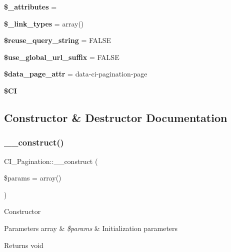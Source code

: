 \begin{DoxyCompactItemize}
{\bfseries \$\+\_\+attributes} = \textquotesingle{}\textquotesingle{}
\item 
\mbox{\label{class_c_i___pagination_a63e99aae2467079fab32b3f7cde3a826}} 
{\bfseries \$\+\_\+link\+\_\+types} = array()
\item 
\mbox{\label{class_c_i___pagination_a5fe5c72a94f8e6bd754d5e19edf2b03c}} 
{\bfseries \$reuse\+\_\+query\+\_\+string} = F\+A\+L\+SE
\item 
\mbox{\label{class_c_i___pagination_ac5aebb3787c54eb43b049c39f379b55e}} 
{\bfseries \$use\+\_\+global\+\_\+url\+\_\+suffix} = F\+A\+L\+SE
\item 
\mbox{\label{class_c_i___pagination_a8b4c5eb3147f58a9e01782ca735e7660}} 
{\bfseries \$data\+\_\+page\+\_\+attr} = \textquotesingle{}data-\/ci-\/pagination-\/page\textquotesingle{}
\item 
\mbox{\label{class_c_i___pagination_a2d4177a5ace764b61f32b93b162ef060}} 
{\bfseries \$\+CI}
\end{DoxyCompactItemize}


\subsection{Constructor \& Destructor Documentation}
\mbox{\label{class_c_i___pagination_ae95f7119c3793c9f65f64c714f85b504}} 
\subsubsection{\texorpdfstring{\+\_\+\+\_\+construct()}{\_\_construct()}}
{\footnotesize\ttfamily C\+I\+\_\+\+Pagination\+::\+\_\+\+\_\+construct (\begin{DoxyParamCaption}\item[{}]{\$params = {\ttfamily array()} }\end{DoxyParamCaption})}

Constructor


\begin{DoxyParams}[1]{Parameters}
array & {\em \$params} & Initialization parameters \\
\hline
\end{DoxyParams}
\begin{DoxyReturn}{Returns}
void 
\end{DoxyReturn}


